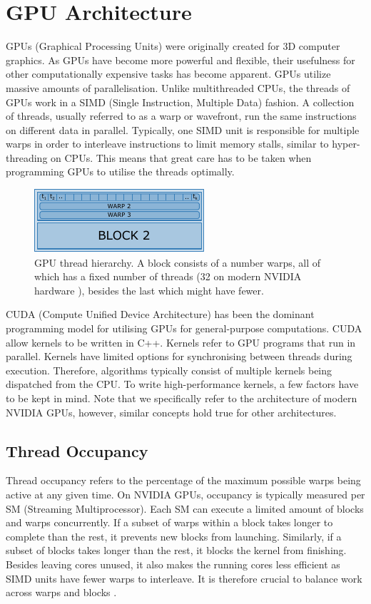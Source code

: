 
\section{GPU Architecture}
GPUs (Graphical Processing Units) were originally created for 3D computer graphics. As GPUs have become more powerful and flexible, their usefulness for other computationally expensive tasks has become apparent. GPUs utilize massive amounts of parallelisation. Unlike multithreaded CPUs, the threads of GPUs work in a SIMD (Single Instruction, Multiple Data) fashion. A collection of threads, usually referred to as a warp or wavefront, run the same instructions on different data in parallel. Typically, one SIMD unit is responsible for multiple warps in order to interleave instructions to limit memory stalls, similar to hyper-threading on CPUs. This means that great care has to be taken when programming GPUs to utilise the threads optimally.\\

\begin{figure}[h]
    \includegraphics[scale=2]{figures/gpu_threads.pdf}
    \centering
    \caption{GPU thread hierarchy. A block consists of a number warps, all of which has a fixed number of threads (32 on modern NVIDIA hardware \citep{nvidiaadaarch}), besides the last which might have fewer.}
\end{figure}

CUDA (Compute Unified Device Architecture) has been the dominant programming model for utilising GPUs for general-purpose computations. CUDA allow kernels to be written in C++. Kernels refer to GPU programs that run in parallel. Kernels have limited options for synchronising between threads during execution. Therefore, algorithms typically consist of multiple kernels being dispatched from the CPU. To write high-performance kernels, a few factors have to be kept in mind. Note that we specifically refer to the architecture of modern NVIDIA GPUs, however, similar concepts hold true for other architectures.

\subsection{Thread Occupancy}
Thread occupancy refers to the percentage of the maximum possible warps being active at any given time. On NVIDIA GPUs, occupancy is typically measured per SM (Streaming Multiprocessor). Each SM can execute a limited amount of blocks and warps concurrently. If a subset of warps within a block takes longer to complete than the rest, it prevents new blocks from launching. Similarly, if a subset of blocks takes longer than the rest, it blocks the kernel from finishing. Besides leaving cores unused, it also makes the running cores less efficient as SIMD units have fewer warps to interleave. It is therefore crucial to balance work across warps and blocks \citep{Jeon2022}.


